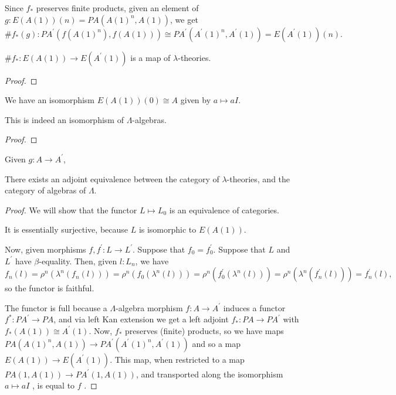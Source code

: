 \begin{definition}
  Since $ f_* $ preserves finite products, given an element of $ g: E(A(1))(n) = PA(A(1)^n, A(1)) $, we get
  \[ \# f_*(g): PA^\prime(f(A(1)^n), f(A(1))) \cong PA^\prime(A^\prime(1)^n, A^\prime(1)) = E(A^\prime(1))(n). \]
\end{definition}

\begin{lemma}
  $ \# f_*: E(A(1)) \to E(A^\prime(1)) $ is a map of $ \lambda $-theories.
\end{lemma}
\begin{proof}
  \TODO
\end{proof}

\begin{definition}
  We have an isomorphism $ E(A(1))(0) \cong A $ given by $ a \mapsto a I $.
\end{definition}

\begin{lemma}
  This is indeed an isomorphism of $ \Lambda $-algebras.
\end{lemma}
\begin{proof}
  \TODO
\end{proof}

\begin{lemma}
  Given $ g: A \to A^\prime $,
\end{lemma}

\begin{theorem}
  There exists an adjoint equivalence between the category of $ \lambda $-theories, and the category of algebras of $ \Lambda $.
\end{theorem}
\begin{proof}
  We will show that the functor $ L \mapsto L_0 $ is an equivalence of categories.

  It is essentially surjective, because $ L $ is isomorphic \TODO to $ E(A(1)) $.

  Now, given morphisms $ f, f^\prime: L \to L^\prime $. Suppose that $ f_0 = f^\prime_0 $. Suppose that $ L $ and $ L^\prime $ have $ \beta $-equality. Then, given $ l: L_n $, we have
  \[ f_n(l) = \rho^n(\lambda^n(f_n(l))) = \rho^n(f_0(\lambda^n(l))) = \rho^n(f^\prime_0(\lambda^n(l))) = \rho^n(\lambda^n(f^\prime_n(l))) = f^\prime_n(l), \]
  so the functor is faithful.

  The functor is full because a $ \Lambda $-algebra morphism $ f: A \to A^\prime $ induces a functor $ f^*: PA^\prime \to PA $, and via left Kan extension we get a left adjoint $ f_*: PA \to PA^\prime $ with $ f_*(A(1)) \cong A^\prime(1) $. Now, $ f_* $ preserves (finite) products, so we have maps $ PA(A(1)^n, A(1)) \to PA^\prime(A^\prime(1)^n, A^\prime(1)) $ and so a map $ E(A(1)) \to E(A^\prime(1)) $. This map, when restricted to a map $ PA(1, A(1)) \to PA^\prime(1, A(1)) $, and transported along the isomorphism $ a \mapsto a I $ \TODO, is equal to $ f $ \TODO.
\end{proof}

